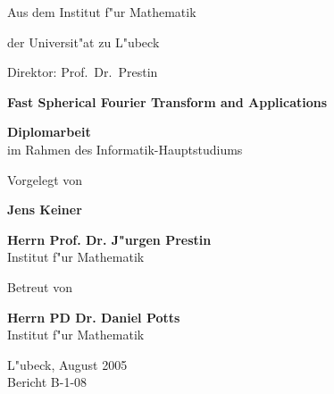 \documentclass[a4paper,12pt]{article}
\begin{document}
\thispagestyle{empty}
\hoffset-1.2cm
\vspace{2cm}
\begin{center}
Aus dem Institut f"ur Mathematik

der Universit"at zu L"ubeck

Direktor: Prof.\ Dr.\  Prestin

\vspace{2cm}

{\Large {\bf Fast Spherical Fourier Transform and Applications}}

\medskip


\vspace{1.5cm}

{\bf Diplomarbeit}\\ im Rahmen des Informatik-Hauptstudiums\\

\vspace{3cm}

Vorgelegt von
 
{\bf Jens Keiner}

\vspace{1.5cm}

{\bf Herrn Prof. Dr. J"urgen Prestin}\\Institut f"ur Mathematik



\vspace{5mm}
Betreut von 

{\bf Herrn PD Dr. Daniel Potts}
    \\Institut f"ur Mathematik

\vspace{1cm}
L"ubeck, August 2005\\
Bericht B-1-08
\end{center}
\end{document}
